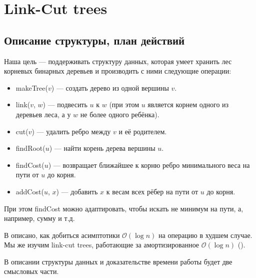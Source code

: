 \section{Link-Cut trees}

\subsection{Описание структуры, план действий}

Наша цель --- поддерживать структуру данных, которая умеет хранить лес корневых бинарных деревьев и производить с ними следующие операции:

\begin{itemize}
    \item makeTree($v$) --- создать дерево из одной вершины $v$.
    \item link($v$, $w$) --- подвесить $u$ к $w$ (при этом $u$ является корнем одного из деревьев леса, а у $w$ не более одного ребёнка).
    \item cut($v$) --- удалить ребро между $v$ и её родителем.
    \item findRoot($u$) --- найти корень дерева вершины $u$.
    \item findCost($u$) --- возвращает ближайшее к корню ребро минимального веса на пути от $u$ до корня.
    \item addCost($u$, $x$) --- добавить $x$ к весам всех рёбер на пути от $u$ до корня.
\end{itemize}

При этом findCost можно адаптировать, чтобы искать не минимум на пути, а, например, сумму и т.д.

В \cite{sleator1983linkcut} описано, как добиться асимптотики $\mathcal{O}(\log{n})$ на операцию в худшем случае. Мы же изучим link-cut trees, работающие за амортизированное $\mathcal{O}(\log{n})$ (\cite{tarjan1984linkcut}).

В описании структуры данных и доказательстве времени работы будет две смысловых части.

